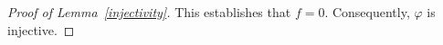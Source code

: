 \documentclass[10pt,a4paper]{amsart}
\begin{document}
\begin{proof}[Proof of Lemma~\ref{injectivity}]
This establishes that $f=0$.
Consequently, $\varphi$ is injective.
\end{proof}
\end{document}
